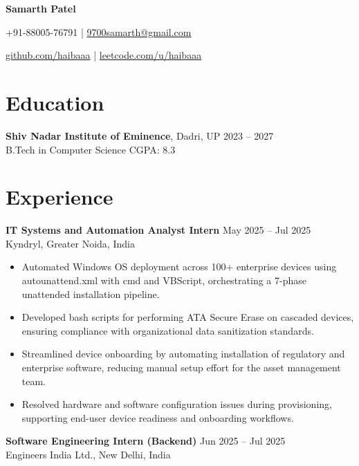 \documentclass[a4paper,10pt]{article}
\begin{document}
\centerline{\Huge \bfseries Samarth Patel}
\centerline{+91-88005-76791 \quad | \quad \href{mailto:9700samarth@gmail.com}{9700samarth@gmail.com}}
\centerline{\href{https://github.com/haibaaa}{github.com/haibaaa} \quad | \quad \href{https://leetcode.com/u/haibaaa}{leetcode.com/u/haibaaa}}

\section*{Education}
\vspace{-6pt}
\textbf{Shiv Nadar Institute of Eminence}, Dadri, UP \hfill 2023 -- 2027 \\
B.Tech in Computer Science \hfill CGPA: 8.3 \\

\section*{Experience}
\vspace{-6pt}

\textbf{IT Systems and Automation Analyst Intern} \hfill May 2025 -- Jul 2025 \\
Kyndryl, Greater Noida, India

\begin{itemize}[noitemsep, topsep=1pt]
    \item Automated Windows OS deployment across 100+ enterprise devices using autounattend.xml with cmd and VBScript, orchestrating a 7-phase unattended installation pipeline.
    \item Developed bash scripts for performing ATA Secure Erase on cascaded devices, ensuring compliance with organizational data sanitization standards.
    \item Streamlined device onboarding by automating installation of regulatory and enterprise software, reducing manual setup effort for the asset management team.
    \item Resolved hardware and software configuration issues during provisioning, supporting end-user device readiness and onboarding workflows.
\end{itemize}

\par\noindent
\textbf{Software Engineering Intern (Backend)} \hfill Jun 2025 -- Jul 2025 \\
Engineers India Ltd., New Delhi, India
\end{document}
